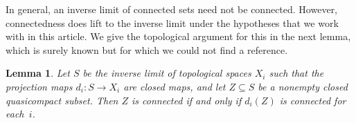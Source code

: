 \documentclass[preprint, 11pt,nonatbib]{elsarticle}
\DeclareMathOperator{\Zar}{Zar}
\newtheorem{lemma}[theorem]{Lemma}
\theoremstyle{definition}
\numberwithin{theorem}{section}
\begin{document}


In general, an inverse limit of connected sets need not be connected. However, connectedness does lift to the inverse limit under the  hypotheses that we work with in this article. We give the topological argument for this in the next lemma, which  is surely known but for which we could not find a reference.
 
\begin{lemma} \label{spectral connected 1}
Let $S$ be the inverse limit of topological spaces $X_i$ such that the projection maps $d_i : S \rightarrow X_i$ are closed maps, and let $Z \subseteq S$ be a nonempty closed quasicompact subset.
Then $Z$ is connected if and only if $d_i (Z)$ is connected for each~$i$. 
\end{lemma}
 
\end{document}
